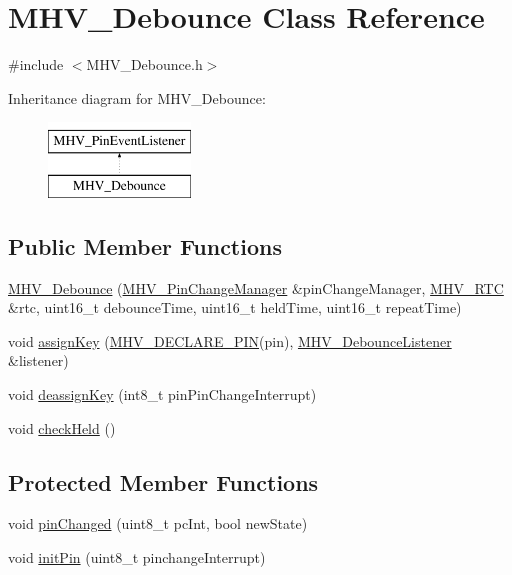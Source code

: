 \hypertarget{class_m_h_v___debounce}{\section{M\-H\-V\-\_\-\-Debounce Class Reference}
\label{class_m_h_v___debounce}
}


{\ttfamily \#include $<$M\-H\-V\-\_\-\-Debounce.\-h$>$}

Inheritance diagram for M\-H\-V\-\_\-\-Debounce\-:\begin{figure}[H]
\begin{center}
\leavevmode
\includegraphics[height=2.000000cm]{class_m_h_v___debounce}
\end{center}
\end{figure}
\subsection*{Public Member Functions}
\begin{DoxyCompactItemize}
\item 
\hyperlink{class_m_h_v___debounce_a68049104b4f0784dcd39658cbd0728ec}{M\-H\-V\-\_\-\-Debounce} (\hyperlink{class_m_h_v___pin_change_manager}{M\-H\-V\-\_\-\-Pin\-Change\-Manager} \&pin\-Change\-Manager, \hyperlink{class_m_h_v___r_t_c}{M\-H\-V\-\_\-\-R\-T\-C} \&rtc, uint16\-\_\-t debounce\-Time, uint16\-\_\-t held\-Time, uint16\-\_\-t repeat\-Time)
\item 
void \hyperlink{class_m_h_v___debounce_ab09a603164dc481efbffd700d7ae0fa3}{assign\-Key} (\hyperlink{_m_h_v__io_8h_afb172d17be3890bb07e5ceec5a014b91}{M\-H\-V\-\_\-\-D\-E\-C\-L\-A\-R\-E\-\_\-\-P\-I\-N}(pin), \hyperlink{class_m_h_v___debounce_listener}{M\-H\-V\-\_\-\-Debounce\-Listener} \&listener)
\item 
void \hyperlink{class_m_h_v___debounce_aca222868f632951928ff67b12c6ca960}{deassign\-Key} (int8\-\_\-t pin\-Pin\-Change\-Interrupt)
\item 
void \hyperlink{class_m_h_v___debounce_a581f7626d54332eec3e34bb5367e1148}{check\-Held} ()
\end{DoxyCompactItemize}
\subsection*{Protected Member Functions}
\begin{DoxyCompactItemize}
\item 
void \hyperlink{class_m_h_v___debounce_abe77ae67fb3b94307edf52ddeaf768da}{pin\-Changed} (uint8\-\_\-t pc\-Int, bool new\-State)
\item 
void \hyperlink{class_m_h_v___debounce_ab5cc2cbf8e925708f01d2b7d1b4a2939}{init\-Pin} (uint8\-\_\-t pinchange\-Interrupt)
\end{DoxyCompactItemize}
